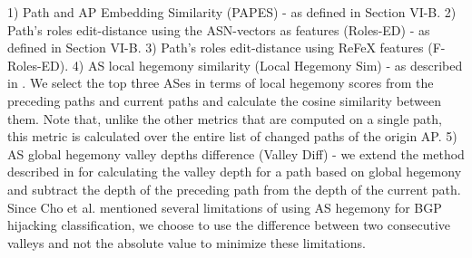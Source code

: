 \documentclass[10pt,journal]{IEEEtran}
\begin{document}
\begin{table}[h]
\centering
\caption{SUMMARY OF THE NUMBER OF FLAGGED CANDIDATES BASED ON DIFFERENCE METRICS FOR THE 4 CHOSEN TIMESTAMPS. HERE, WE DID NOT REMOVE EVENTS WITH ASNS WHICH SIGNIFICANTLY APPEARED IN THE PREVIOUS TIME-SLOT ANALYSIS}
\label{tab:flagged_summary}
\end{table}

1) Path and AP Embedding Similarity (PAPES) - as defined in Section VI-B.
2) Path's roles edit-distance using the ASN-vectors as features (Roles-ED) - as defined in Section VI-B.
3) Path's roles edit-distance using ReFeX \cite{henderson2011its} features (F-Roles-ED).
4) AS local hegemony similarity (Local Hegemony Sim) - as described in \cite{cho2019bgp}. We select the top three ASes in terms of local hegemony scores from the preceding paths and current paths and calculate the cosine similarity between them. Note that, unlike the other metrics that are computed on a single path, this metric is calculated over the entire list of changed paths of the origin AP.
5) AS global hegemony valley depths difference (Valley Diff) - we extend the method described in \cite{cho2019bgp} for calculating the valley depth for a path based on global hegemony and subtract the depth of the preceding path from the depth of the current path. Since Cho et al. \cite{cho2019bgp} mentioned several limitations of using AS hegemony for BGP hijacking classification, we choose to use the difference between two consecutive valleys and not the absolute value to minimize these limitations.
\end{document}
